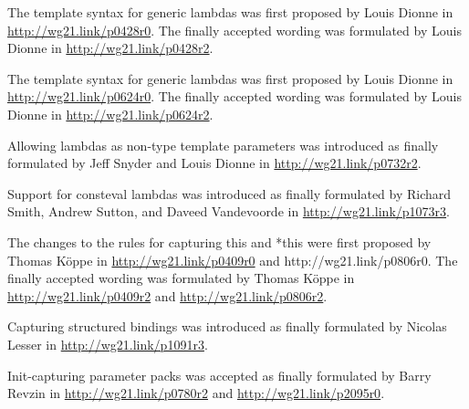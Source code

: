 The template syntax for generic lambdas was first proposed by Louis Dionne in \url{http://wg21.link/p0428r0}. The finally accepted wording was formulated by Louis Dionne in \url{http://wg21.link/p0428r2}.

The template syntax for generic lambdas was first proposed by Louis Dionne in \url{http://wg21.link/p0624r0}. The finally accepted wording was formulated by Louis Dionne in \url{http://wg21.link/p0624r2}.

Allowing lambdas as non-type template parameters was introduced as finally formulated by Jeff Snyder and Louis Dionne in \url{http://wg21.link/p0732r2}.

Support for consteval lambdas was introduced as finally formulated by Richard Smith, Andrew Sutton, and Daveed Vandevoorde in \url{http://wg21.link/p1073r3}.

The changes to the rules for capturing this and *this were first proposed by Thomas K{\"o}ppe in \url{http://wg21.link/p0409r0} and http://wg21.link/p0806r0. The finally accepted wording was formulated by Thomas K{\"o}ppe in \url{http://wg21.link/p0409r2} and \url{http://wg21.link/p0806r2}.

Capturing structured bindings was introduced as finally formulated by Nicolas Lesser in \url{http://wg21.link/p1091r3}.

Init-capturing parameter packs was accepted as finally formulated by Barry Revzin in \url{http://wg21.link/p0780r2} and \url{http://wg21.link/p2095r0}.